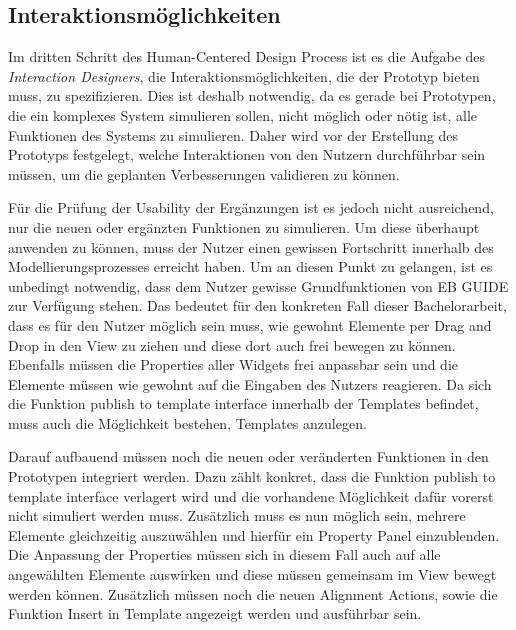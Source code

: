 \subsection{Interaktionsmöglichkeiten}

Im dritten Schritt des Human-Centered Design Process ist es die Aufgabe des \textit{Interaction Designers}, die Interaktionsmöglichkeiten, die der Prototyp bieten muss, zu spezifizieren.
Dies ist deshalb notwendig, da es gerade bei Prototypen, die ein komplexes System simulieren sollen, nicht möglich oder nötig ist, alle Funktionen des Systems zu simulieren.
Daher wird vor der Erstellung des Prototyps festgelegt, welche Interaktionen von den Nutzern durchführbar sein müssen, um die geplanten Verbesserungen validieren zu können.

Für die Prüfung der Usability der Ergänzungen ist es jedoch nicht ausreichend, nur die neuen oder ergänzten Funktionen zu simulieren.
Um diese überhaupt anwenden zu können, muss der Nutzer einen gewissen Fortschritt innerhalb des Modellierungsprozesses erreicht haben.
Um an diesen Punkt zu gelangen, ist es unbedingt notwendig, dass dem Nutzer gewisse Grundfunktionen von EB GUIDE zur Verfügung stehen.
Das bedeutet für den konkreten Fall dieser Bachelorarbeit, dass es für den Nutzer möglich sein muss, wie gewohnt Elemente per Drag and Drop in den View zu ziehen und diese dort auch frei bewegen zu können.
Ebenfalls müssen die Properties aller Widgets frei anpassbar sein und die Elemente müssen wie gewohnt auf die Eingaben des Nutzers reagieren.
Da sich die Funktion \glqq publish to template interface\grqq{} innerhalb der Templates befindet, muss auch die Möglichkeit bestehen, Templates anzulegen.

Darauf aufbauend müssen noch die neuen oder veränderten Funktionen in den Prototypen integriert werden.
Dazu zählt konkret, dass die Funktion \glqq publish to template interface\grqq{} verlagert wird und die vorhandene Möglichkeit dafür vorerst nicht simuliert werden muss.
Zusätzlich muss es nun möglich sein, mehrere Elemente gleichzeitig auszuwählen und hierfür ein Property Panel einzublenden.
Die Anpassung der Properties müssen sich in diesem Fall auch auf alle angewählten Elemente auswirken und diese müssen gemeinsam im View bewegt werden können.
Zusätzlich müssen noch die neuen Alignment Actions, sowie die Funktion \glqq Insert in Template\grqq{} angezeigt werden und ausführbar sein.

